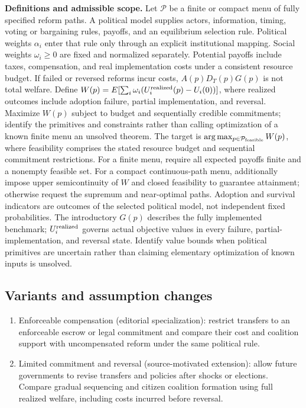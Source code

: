 \documentclass[11pt,a4paper]{article}
\begin{document}
\textbf{Definitions and admissible scope.} Let \(\mathcal P\) be a finite or compact menu of fully specified reform paths. A political model supplies actors, information, timing, voting or bargaining rules, payoffs, and an equilibrium selection rule. Political weights \(\alpha_i\) enter that rule only through an explicit institutional mapping. Social weights \(\omega_i\ge0\) are fixed and normalized separately. Potential payoffs include taxes, compensation, and real implementation costs under a consistent resource budget. If failed or reversed reforms incur costs, \(A(p)D_T(p)G(p)\) is not total welfare. Define \(W(p)=E[\sum_i\omega_i(U_i^{\rm realized}(p)-U_i(0))]\), where realized outcomes include adoption failure, partial implementation, and reversal. Maximize \(W(p)\) subject to budget and sequentially credible commitments; identify the primitives and constraints rather than calling optimization of a known finite menu an unsolved theorem. The target is \(\arg\max_{p\in\mathcal P_{\rm feasible}}W(p)\), where feasibility comprises the stated resource budget and sequential commitment restrictions. For a finite menu, require all expected payoffs finite and a nonempty feasible set. For a compact continuous-path menu, additionally impose upper semicontinuity of \(W\) and closed feasibility to guarantee attainment; otherwise request the supremum and near-optimal paths. Adoption and survival indicators are outcomes of the selected political model, not independent fixed probabilities. The introductory \(G(p)\) describes the fully implemented benchmark; \(U_i^{\rm realized}\) governs actual objective values in every failure, partial-implementation, and reversal state. Identify value bounds when political primitives are uncertain rather than claiming elementary optimization of known inputs is unsolved.
\subsection*{Variants and assumption changes}
\begin{enumerate}
\item Enforceable compensation (editorial specialization): restrict transfers to an enforceable escrow or legal commitment and compare their cost and coalition support with uncompensated reform under the same political rule.
\item Limited commitment and reversal (source-motivated extension): allow future governments to revise transfers and policies after shocks or elections. Compare gradual sequencing and citizen coalition formation using full realized welfare, including costs incurred before reversal.
\end{enumerate}
\end{document}
